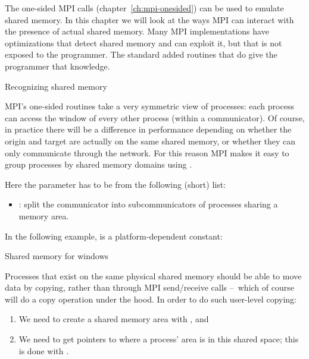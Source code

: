 
The one-sided MPI calls (chapter~\ref{ch:mpi-onesided}) can be used to
emulate shared memory. In this chapter we will look at the ways MPI
can interact with the presence of actual shared memory. Many MPI
implementations have optimizations that detect shared memory and can
exploit it, but that is not exposed to the programmer. The
 standard added routines that do give the programmer
that knowledge.

 {Recognizing shared memory}
\label{mpi-comm-split-type}

MPI's one-sided routines take a very symmetric view of processes:
each process can access the window of every other process (within a communicator).
Of course, in practice there will be a difference in performance
depending on whether the origin and target are actually
on the same shared memory, or whether they can only communicate through the network.
For this reason MPI makes it easy to group processes by shared memory domains
using .


Here the  parameter has to be from the following (short) list:
\begin{itemize}
\item {}: split the communicator into subcommunicators
  of processes sharing a memory area.
\end{itemize}

In the following example,  is a platform-dependent
constant:
%

 {Shared memory for windows}

Processes that exist on the same physical shared memory should be able
to move data by copying, rather than through MPI send/receive calls
--~which of course will do a copy operation under the hood.
In order to do such user-level copying:
\begin{enumerate}
\item We need to create a shared memory area with
  , and
\item We need to get pointers to where a process' area is in this
  shared space; this is done with .
\end{enumerate}

